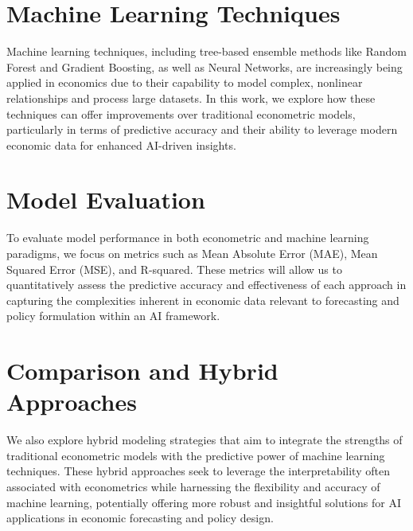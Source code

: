 \section{Machine Learning Techniques}
\label{subsec:machine_learning_techniques}
Machine learning techniques, including tree-based ensemble methods like Random Forest and Gradient Boosting, as well as Neural Networks, are increasingly being applied in economics due to their capability to model complex, nonlinear relationships and process large datasets. In this work, we explore how these techniques can offer improvements over traditional econometric models, particularly in terms of predictive accuracy and their ability to leverage modern economic data for enhanced AI-driven insights.

\section{Model Evaluation}
\label{subsec:model_evaluation}
To evaluate model performance in both econometric and machine learning paradigms, we focus on metrics such as Mean Absolute Error (MAE), Mean Squared Error (MSE), and R-squared. These metrics will allow us to quantitatively assess the predictive accuracy and effectiveness of each approach in capturing the complexities inherent in economic data relevant to forecasting and policy formulation within an AI framework.

\section{Comparison and Hybrid Approaches}
\label{subsec:hybrid_approaches}
We also explore hybrid modeling strategies that aim to integrate the strengths of traditional econometric models with the predictive power of machine learning techniques. These hybrid approaches seek to leverage the interpretability often associated with econometrics while harnessing the flexibility and accuracy of machine learning, potentially offering more robust and insightful solutions for AI applications in economic forecasting and policy design.